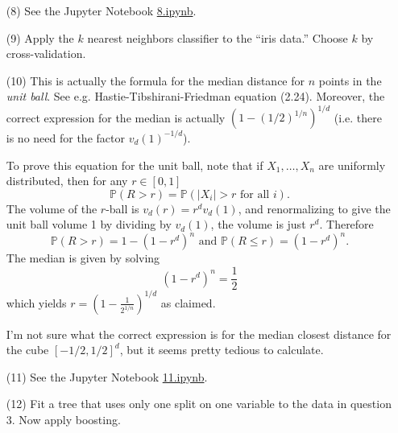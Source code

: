 \documentclass[10pt]{article}
\renewcommand{\P}{\mathbb{P}}
\begin{document}
\begin{enumerate}
\item[(8)] See the Jupyter Notebook
\href{https://github.com/ajrasmus/some_of_statistics/blob/main/chapter_22/8.ipynb}{8.ipynb}.

\item[(9)] Apply the $k$ nearest neighbors classifier to the ``iris data.''
Choose $k$ by cross-validation.

\item[(10)]
This is actually the formula for the median distance for $n$ points in the
\emph{unit ball}. See e.g. Hastie-Tibshirani-Friedman equation (2.24). Moreover,
the correct expression for the median is actually $(1 - (1/2)^{1/n})^{1/d}$ (i.e.
there is no need for the factor $v_d(1)^{-1/d}$).

To prove this equation for the unit ball, note that if $X_1,\ldots,X_n$
are uniformly distributed, then for any $r \in [0,1]$
\[
    \P(R>r) = \P(|X_i| > r \text{ for all } i).
\]
The volume of the $r$-ball is $v_d(r)=r^d v_d(1)$, and renormalizing to give
the unit ball volume 1 by dividing by $v_d(1)$, the volume is just $r^d$.
Therefore
\[
    \P(R>r) = 1 - (1-r^d)^n \text{ and } \P(R \leq r) = (1-r^d)^n.
\]
The median is given by solving
\[
    (1-r^d)^n = \frac{1}{2}
\]
which yields $r=\left(1-\frac{1}{2^{1/n}}\right)^{1/d}$ as claimed.

I'm not sure what the correct expression is for the median closest distance
for the cube $[-1/2,1/2]^d$, but it seems pretty tedious to calculate.

\item[(11)]
See the Jupyter Notebook
\href{https://github.com/ajrasmus/some_of_statistics/blob/main/chapter_22/11.ipynb}{11.ipynb}.

\item[(12)] Fit a tree that uses only one split on one variable to the data in question
3. Now apply boosting.
\end{enumerate}
\end{document}
